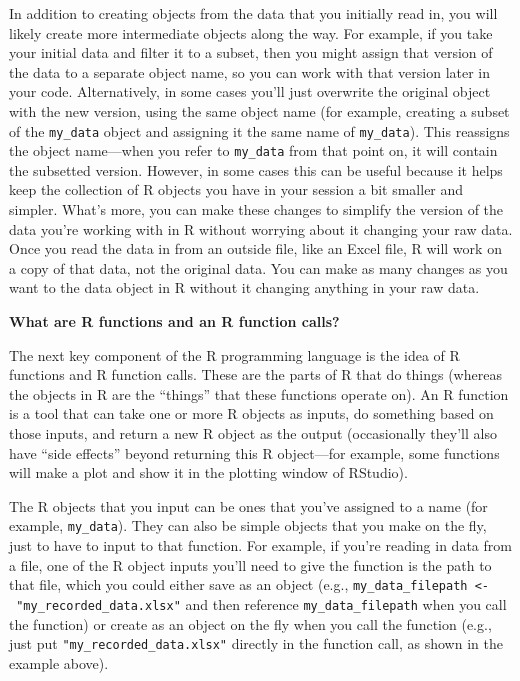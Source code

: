 \documentclass[]{tufte-book}
\begin{document}
In addition to creating objects from the data that you initially read in, you will
likely create more intermediate objects along the way. For example, if you take
your initial data and filter it to a subset, then you might assign that version
of the data to a separate object name, so you can work with that version later in
your code. Alternatively, in some cases you'll just overwrite the original object
with the new version, using the same object name (for example, creating a subset of
the \texttt{my\_data} object and assigning it the same name of \texttt{my\_data}). This reassigns the
object name---when you refer to \texttt{my\_data} from that point on, it will contain the
subsetted version. However, in some cases this can be useful because it helps keep
the collection of R objects you have in your session a bit smaller and simpler. What's
more, you can make these changes to simplify the version of the data you're working
with in R without worrying about it changing your raw data. Once you read the data
in from an outside file, like an Excel file, R will work on a copy of that data, not
the original data. You can make as many changes as you want to the data object in R
without it changing anything in your raw data.

\textbf{What are R functions and an R function calls?}

The next key component of the R programming language is the idea of R functions
and R function calls. These are the parts of R that do things (whereas the objects in R
are the ``things'' that these functions operate on). An R function is a tool that can
take one or more R objects as inputs, do something based on those inputs, and return a
new R object as the output (occasionally they'll also have ``side effects'' beyond returning
this R object---for example, some functions will make a plot and show it in the plotting
window of RStudio).

The R objects that you input can be ones that you've assigned to a name (for
example, \texttt{my\_data}). They can also be simple objects that you make on the fly,
just to have to input to that function. For example, if you're reading in data
from a file, one of the R object inputs you'll need to give the function is the
path to that file, which you could either save as an object (e.g.,
\texttt{my\_data\_filepath\ \textless{}-\ "my\_recorded\_data.xlsx"} and then reference
\texttt{my\_data\_filepath} when you call the function) or create as an object on the fly
when you call the function (e.g., just put \texttt{"my\_recorded\_data.xlsx"} directly in
the function call, as shown in the example above).
\end{document}
